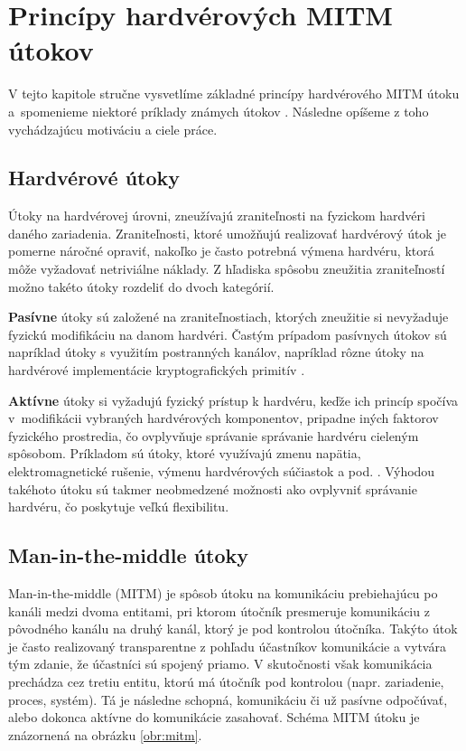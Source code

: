 \chapter{Princípy hardvérových MITM útokov}
\label{kap:principy}
V tejto kapitole stručne vysvetlíme základné princípy hardvérového MITM útoku a~spomenieme niektoré príklady známych útokov \cite{mitmSmartphone, mitmTouch, mitmTPM, mitmBitlocker, mitmI2C}. Následne opíšeme z toho vychádzajúcu motiváciu a ciele práce.

\section{Hardvérové útoky}
Útoky na hardvérovej úrovni, zneužívajú zraniteľnosti na fyzickom hardvéri daného zariadenia. Zraniteľnosti, ktoré umožňujú realizovať hardvérový útok je pomerne náročné opraviť, nakoľko je často potrebná výmena hardvéru, ktorá môže vyžadovať netriviálne náklady. Z hľadiska spôsobu zneužitia zraniteľností možno takéto útoky rozdeliť do dvoch kategórií.

\textbf{Pasívne} útoky sú založené na zraniteľnostiach, ktorých zneužitie si nevyžaduje fyzickú modifikáciu na danom hardvéri. Častým prípadom pasívnych útokov sú napríklad útoky s využitím postranných kanálov, napríklad rôzne útoky na hardvérové implementácie kryptografických primitív \cite{hwSec}.

\textbf{Aktívne} útoky si vyžadujú fyzický prístup k hardvéru, keďže ich princíp spočíva v~modifikácii vybraných hardvérových komponentov, pripadne iných faktorov fyzického prostredia, čo ovplyvňuje správanie správanie hardvéru cieleným spôsobom. Príkladom sú útoky, ktoré využívajú zmenu napätia, elektromagnetické rušenie, výmenu hardvérových súčiastok a pod. \cite{hwSec}. Výhodou takéhoto útoku sú takmer neobmedzené možnosti ako ovplyvniť správanie hardvéru, čo poskytuje veľkú flexibilitu.

\section{Man-in-the-middle útoky}
Man-in-the-middle (MITM) je spôsob útoku na komunikáciu prebiehajúcu po kanáli medzi dvoma entitami, pri ktorom útočník presmeruje komunikáciu z pôvodného kanálu na druhý kanál, ktorý je pod kontrolou útočníka. Takýto útok je často realizovaný transparentne z pohľadu účastníkov komunikácie a vytvára tým zdanie, že účastníci sú spojený priamo. V skutočnosti však komunikácia prechádza cez tretiu entitu, ktorú má útočník pod kontrolou (napr. zariadenie, proces, systém). Tá je následne schopná, komunikáciu či už pasívne odpočúvať, alebo dokonca aktívne do komunikácie zasahovať. Schéma MITM útoku je znázornená na obrázku \ref{obr:mitm}.

